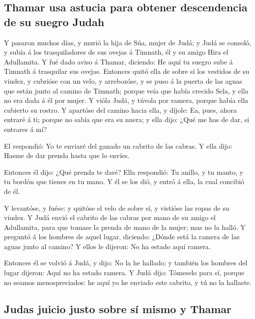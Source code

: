 \hypertarget{thamar-usa-astucia-para-obtener-descendencia-de-su-suegro-judah}{%
\subsection{Thamar usa astucia para obtener descendencia de su suegro
Judah}\label{thamar-usa-astucia-para-obtener-descendencia-de-su-suegro-judah}}

 Y pasaron muchos días, y murió la hija de Súa, mujer de
Judá; y Judá se consoló, y subía á los trasquiladores de sus ovejas á
Timnath, él y su amigo Hira el Adullamita.  Y fué dado
aviso á Thamar, diciendo: He aquí tu suegro sube á Timnath á trasquilar
sus ovejas.  Entonces quitó ella de sobre sí los vestidos
de su viudez, y cubrióse con un velo, y arrebozóse, y se puso á la
puerta de las aguas que están junto al camino de Timnath; porque veía
que había crecido Sela, y ella no era dada á él por mujer. 
Y vióla Judá, y túvola por ramera, porque había ella cubierto su rostro.
 Y apartóse del camino hacia ella, y díjole: Ea, pues,
ahora entraré á ti; porque no sabía que era su nuera; y ella dijo: ¿Qué
me has de dar, si entrares á mí?

 El respondió: Yo te enviaré del ganado un cabrito de las
cabras. Y ella dijo: Hasme de dar prenda hasta que lo envíes.

 Entonces él dijo: ¿Qué prenda te daré? Ella respondió: Tu
anillo, y tu manto, y tu bordón que tienes en tu mano. Y él se los dió,
y entró á ella, la cual concibió de él.

 Y levantóse, y fuése: y quitóse el velo de sobre sí, y
vistióse las ropas de su viudez.  Y Judá envió el cabrito
de las cabras por mano de su amigo el Adullamita, para que tomase la
prenda de mano de la mujer; mas no la halló.  Y preguntó á
los hombres de aquel lugar, diciendo: ¿Dónde está la ramera de las aguas
junto al camino? Y ellos le dijeron: No ha estado aquí ramera.

 Entonces él se volvió á Judá, y dijo: No la he hallado; y
también los hombres del lugar dijeron: Aquí no ha estado ramera.
 Y Judá dijo: Tómeselo para sí, porque no seamos
menospreciados: he aquí yo he enviado este cabrito, y tú no la hallaste.

\hypertarget{judas-juicio-justo-sobre-suxed-mismo-y-thamar}{%
\subsection{Judas juicio justo sobre sí mismo y
Thamar}\label{judas-juicio-justo-sobre-suxed-mismo-y-thamar}}

